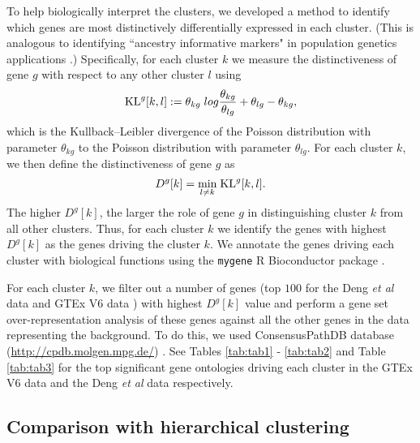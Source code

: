 To help biologically interpret the clusters, we developed a method to identify which genes are most distinctively differentially expressed in each cluster. 
(This is analogous to identifying ``ancestry informative markers" in population genetics applications \cite{Rosenberg2005}.)
 Specifically, for each cluster $k$ we measure the distinctiveness of gene $g$ with respect to any other cluster $l$ using
\begin{equation}
\text{KL}^{g} [k,l] : = \theta_{kg} \; log \frac{\theta_{kg}}{\theta_{lg}} + \theta_{lg} - \theta_{kg},
\end{equation}
which is the Kullback--Leibler divergence of the Poisson distribution with parameter $\theta_{kg}$ to the Poisson distribution with parameter $\theta_{lg}$. 
For each cluster $k$, we then define the distinctiveness of gene $g$ as 
\begin{equation}
D^{g}[k] = \underset{l \neq k}{\min} \; \text{KL}^{g} [k, l].
\end{equation}
The higher $D^g[k]$, the larger the role of gene $g$ in distinguishing cluster $k$ from all other clusters. 
Thus, for each cluster $k$ we identify the genes with highest $D^{g}[k]$ as the genes driving the cluster $k$. 
We annotate the genes driving each cluster with biological functions using the {\tt mygene} R Bioconductor package  \cite{Thompson2014}. 

For each cluster $k$, we filter out a number of genes (top $100$ for the Deng \textit{et al} data \cite{Deng2014} and GTEx V6 data \cite{GTEX2013}) with highest $D^{g}[k]$ value and perform a gene set over-representation analysis of these genes against all the other genes in the data representing the background. To do this, we used ConsensusPathDB database (\url{http://cpdb.molgen.mpg.de/})  \cite{Kamburov2013} \cite{Pentchev2010}. See Tables \ref{tab:tab1} - \ref{tab:tab2} and Table  \ref{tab:tab3} for the top significant gene ontologies driving each cluster in the GTEx V6 data and the Deng \textit{et al} data respectively. 

\subsection{Comparison with hierarchical clustering}

